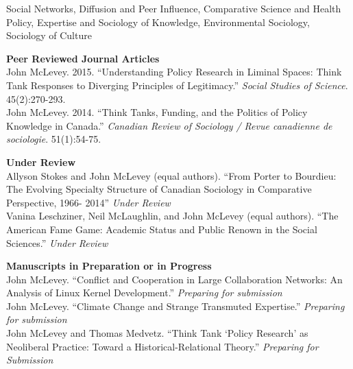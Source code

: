 \documentclass[9pt,usenames,dvipsnames]{article}
\begin{document}

\noindent Social Networks, Diffusion and Peer Influence, Comparative Science and Health Policy, Expertise and Sociology of Knowledge, Environmental Sociology, Sociology of Culture \\


\ind \textbf{Peer Reviewed Journal Articles} \\

\ind John McLevey. 2015. ``Understanding Policy Research in Liminal Spaces: Think Tank Responses to Diverging Principles of Legitimacy.'' \emph{Social Studies of Science}. 45(2):270-293. \\

\ind John McLevey. 2014. ``Think Tanks, Funding, and the Politics of Policy Knowledge in Canada.'' \emph{Canadian Review of Sociology / Revue canadienne de sociologie}. 51(1):54-75.\\


\ind \textbf{Under Review} \\

\ind Allyson Stokes and John McLevey (equal authors). ``From Porter to Bourdieu: The Evolving Specialty Structure of Canadian Sociology in Comparative Perspective, 1966- 2014'' \emph{Under Review} \\

\ind Vanina Leschziner, Neil McLaughlin, and John McLevey (equal authors). ``The American Fame Game: Academic Status and Public Renown in the Social Sciences.'' \emph{Under Review} \\

\pagebreak

\ind \textbf{Manuscripts in Preparation or in Progress} \\

\ind John McLevey. ``Conflict and Cooperation in Large Collaboration Networks: An Analysis of Linux Kernel Development.'' \emph{Preparing for submission} \\

\ind John McLevey. ``Climate Change and Strange Transmuted Expertise.'' \emph{Preparing for submission} \\

\ind John McLevey and Thomas Medvetz. ``Think Tank ‘Policy Research' as Neoliberal Practice: Toward a Historical-Relational Theory.'' \emph{Preparing for Submission}\\
\end{document}
